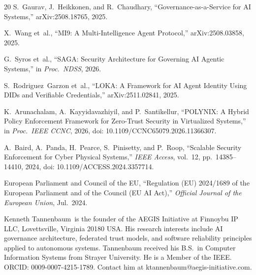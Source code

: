 \documentclass{IEEEcsmag}
\begin{document}
\begin{thebibliography}{20}
S.~Gaurav, J.~Heikkonen, and R.~Chaudhary, ``Governance-as-a-Service for AI Systems,'' arXiv:2508.18765, 2025.

X.~Wang et~al., ``MI9: A Multi-Intelligence Agent Protocol,'' arXiv:2508.03858, 2025.

G.~Syros et~al., ``SAGA: Security Architecture for Governing AI Agentic Systems,'' in {\it Proc.\ NDSS}, 2026.

S.~Rodriguez~Garzon et~al., ``LOKA: A Framework for AI Agent Identity Using DIDs and Verifiable Credentials,'' arXiv:2511.02841, 2025.

K.~Arunachalam, A.~Kayyidavazhiyil, and P.~Santikellur, ``POLYNIX: A Hybrid Policy Enforcement Framework for Zero-Trust Security in Virtualized Systems,'' in {\it Proc.\ IEEE CCNC}, 2026, doi: 10.1109/CCNC65079.2026.11366307.

A.~Baird, A.~Panda, H.~Pearce, S.~Pinisetty, and P.~Roop, ``Scalable Security Enforcement for Cyber Physical Systems,'' {\it IEEE Access}, vol.~12, pp.~14385--14410, 2024, doi: 10.1109/ACCESS.2024.3357714.

European Parliament and Council of the EU, ``Regulation (EU) 2024/1689 of the European Parliament and of the Council (EU AI Act),'' {\it Official Journal of the European Union}, Jul.\ 2024.

\end{thebibliography}

\begin{IEEEbiography}{Kenneth Tannenbaum}{\,}
is the founder of the AEGIS Initiative at Finnoybu IP LLC, Lovettsville, Virginia 20180 USA. His research interests include AI governance architecture, federated trust models, and software reliability principles applied to autonomous systems. Tannenbaum received his B.S.\ in Computer Information Systems from Strayer University. He is a Member of the IEEE. ORCID: 0009-0007-4215-1789. Contact him at ktannenbaum@aegis-initiative.com.
\end{IEEEbiography}
\end{document}
